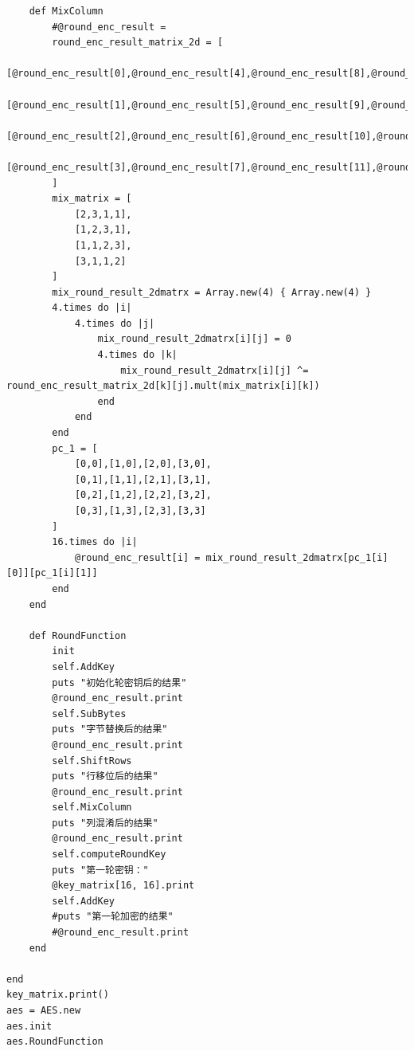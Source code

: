 \documentclass[10pt,a4paper]{article}
\begin{document}
\begin{verbatim}
    def MixColumn
        #@round_enc_result = 
        round_enc_result_matrix_2d = [
            [@round_enc_result[0],@round_enc_result[4],@round_enc_result[8],@round_enc_result[12]],
            [@round_enc_result[1],@round_enc_result[5],@round_enc_result[9],@round_enc_result[13]],
            [@round_enc_result[2],@round_enc_result[6],@round_enc_result[10],@round_enc_result[14]],
            [@round_enc_result[3],@round_enc_result[7],@round_enc_result[11],@round_enc_result[15]]
        ]
        mix_matrix = [
            [2,3,1,1],
            [1,2,3,1],
            [1,1,2,3],
            [3,1,1,2]
        ]
        mix_round_result_2dmatrx = Array.new(4) { Array.new(4) }
        4.times do |i|
            4.times do |j|
                mix_round_result_2dmatrx[i][j] = 0
                4.times do |k|
                    mix_round_result_2dmatrx[i][j] ^= round_enc_result_matrix_2d[k][j].mult(mix_matrix[i][k])
                end
            end
        end
        pc_1 = [
            [0,0],[1,0],[2,0],[3,0],
            [0,1],[1,1],[2,1],[3,1],
            [0,2],[1,2],[2,2],[3,2],
            [0,3],[1,3],[2,3],[3,3]
        ]
        16.times do |i|
            @round_enc_result[i] = mix_round_result_2dmatrx[pc_1[i][0]][pc_1[i][1]]
        end
    end

    def RoundFunction
        init
        self.AddKey
        puts "初始化轮密钥后的结果"
        @round_enc_result.print
        self.SubBytes
        puts "字节替换后的结果"
        @round_enc_result.print
        self.ShiftRows
        puts "行移位后的结果"
        @round_enc_result.print
        self.MixColumn
        puts "列混淆后的结果"
        @round_enc_result.print
        self.computeRoundKey
        puts "第一轮密钥："
        @key_matrix[16, 16].print
        self.AddKey
        #puts "第一轮加密的结果"
        #@round_enc_result.print
    end

end
key_matrix.print()
aes = AES.new
aes.init
aes.RoundFunction
\end{verbatim}
\end{document}
